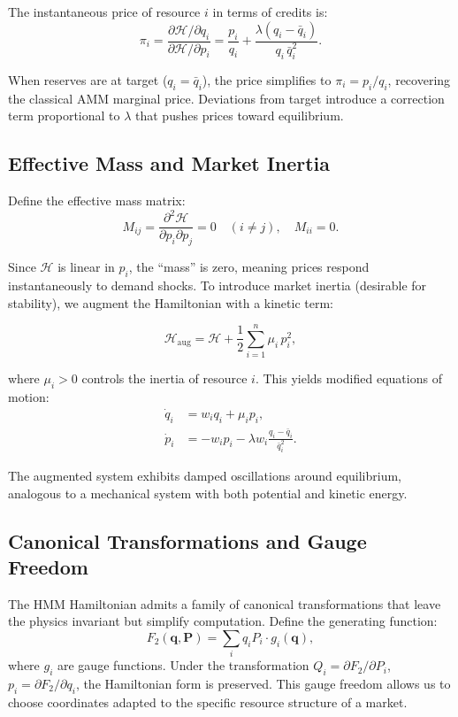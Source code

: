\documentclass[11pt,twocolumn]{article}
\begin{document}
The instantaneous price of resource $i$ in terms of credits is:
\begin{equation}
\pi_i = \frac{\partial \mathcal{H} / \partial q_i}{\partial \mathcal{H} / \partial p_i} = \frac{p_i}{q_i} + \frac{\lambda(q_i - \bar{q}_i)}{q_i \, \bar{q}_i^2}.
\label{eq:price}
\end{equation}

When reserves are at target ($q_i = \bar{q}_i$), the price simplifies to $\pi_i = p_i / q_i$, recovering the classical AMM marginal price. Deviations from target introduce a correction term proportional to $\lambda$ that pushes prices toward equilibrium.

\subsection{Effective Mass and Market Inertia}

Define the effective mass matrix:
\begin{equation}
M_{ij} = \frac{\partial^2 \mathcal{H}}{\partial p_i \partial p_j} = 0 \quad (i \neq j), \quad M_{ii} = 0.
\end{equation}

Since $\mathcal{H}$ is linear in $p_i$, the ``mass'' is zero, meaning prices respond instantaneously to demand shocks. To introduce market inertia (desirable for stability), we augment the Hamiltonian with a kinetic term:

\begin{equation}
\mathcal{H}_{\text{aug}} = \mathcal{H} + \frac{1}{2} \sum_{i=1}^n \mu_i \, p_i^2,
\label{eq:augmented}
\end{equation}

where $\mu_i > 0$ controls the inertia of resource $i$. This yields modified equations of motion:
\begin{align}
\dot{q}_i &= w_i q_i + \mu_i p_i, \\
\dot{p}_i &= -w_i p_i - \lambda w_i \frac{q_i - \bar{q}_i}{\bar{q}_i^2}.
\end{align}

The augmented system exhibits damped oscillations around equilibrium, analogous to a mechanical system with both potential and kinetic energy.

\subsection{Canonical Transformations and Gauge Freedom}

The HMM Hamiltonian admits a family of canonical transformations that leave the physics invariant but simplify computation. Define the generating function:
\begin{equation}
F_2(\bm{q}, \bm{P}) = \sum_i q_i P_i \cdot g_i(\bm{q}),
\end{equation}
where $g_i$ are gauge functions. Under the transformation $Q_i = \partial F_2 / \partial P_i$, $p_i = \partial F_2 / \partial q_i$, the Hamiltonian form is preserved. This gauge freedom allows us to choose coordinates adapted to the specific resource structure of a market.
\end{document}
